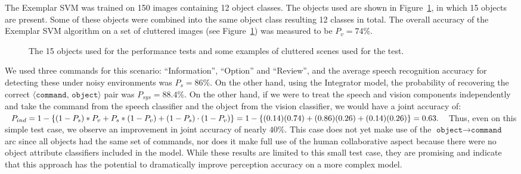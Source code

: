 \documentclass{llncs}
\begin{document}
The Exemplar SVM was trained on 150 images containing 12 object
classes. The objects used are shown in Figure~\ref{fig:test_objects},
in which 15 objects are present. Some of these objects were combined
into the same object class resulting 12 classes in total. The overall
accuracy of the Exemplar SVM algorithm on a set of cluttered images
(see Figure~\ref{fig:test_objects}) was measured to be $P_v =74\%$.
\begin{figure}
\caption{The 15 objects used for the performance tests and some
  examples of cluttered scenes used for the test.}
\label{fig:test_objects}
\end{figure}


We used three commands for this scenario: ``Information'', ``Option''
and ``Review'', and the average speech recognition accuracy for
detecting these under noisy environments was $P_s = 86\%$. On the
other hand, using the Integrator model, the probability of recovering
the correct $\langle \texttt{command, object}\rangle$ pair was
$P_{sys}=88.4\%$. On the other hand, if we were to treat the speech
and vision components independently and take the command from the
speech classifier and the object from the vision classifier, we would
have a joint accuracy of:
\begin{math}
P_{ind} = 1 - \{(1-P_s)* P_{v} + P_s * (1-P_v) + (1-P_s)\cdot (1-P_v)\} \\
= 1 - \{(0.14)(0.74) + (0.86)(0.26) + (0.14)(0.26)\} = 0.63. 
\end{math}
Thus, even on this simple test case, we observe an improvement in
joint accuracy of nearly $40\%$.  This case does not yet make use of
the $\texttt{object}\rightarrow \texttt{command}$ arc since all objects had the same set
of commands, nor does it make full use of the human collaborative
aspect because there were no object attribute classifiers included in
the model. While these results are limited to this small test case,
they are promising and indicate that this approach has the potential
to dramatically improve perception accuracy on a more complex model.
\end{document}
